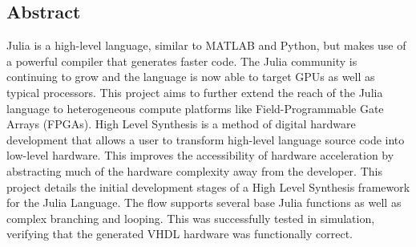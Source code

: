 \thispagestyle{plain}
\vspace*{0.3\textheight}
\begin{center}
\subsection*{Abstract}
\end{center}

Julia is a high-level language, similar to MATLAB and Python, but makes use of a powerful compiler that generates faster code. The Julia community is continuing to grow and the language is now able to target GPUs as well as typical processors. This project aims to further extend the reach of the Julia language to heterogeneous compute platforms like Field-Programmable Gate Arrays (FPGAs). High Level
Synthesis is a method of digital hardware development that allows a user to transform high-level language source code into low-level hardware. This improves the accessibility of hardware acceleration by abstracting much of the hardware complexity away from the developer. This project details the initial development stages of a High Level Synthesis framework for the Julia Language. The flow supports several base Julia functions as well as complex branching and looping. This
was successfully tested in simulation, verifying that the generated VHDL hardware was functionally correct.

\vfill

\iffalse
TODO
need to be more persuasive, why would you want to read this?
not just a summary, not repetition of intro
\fi
